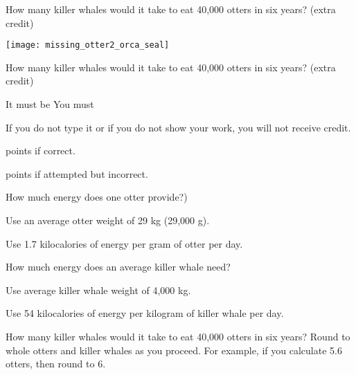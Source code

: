 \documentclass[t]{beamer}
\begin{document}
%
\begin{frame}[t]{How many killer whales would it take to eat 40,000 otters in six years? (extra credit)}

	\texttt{[image: missing\_otter2\_orca\_seal]}

\end{frame}
%
\begin{frame}[t]{How many killer whales would it take to eat 40,000 otters in six years? (extra credit)}

	\hangpara It must be  You must 

	\hangpara If you do not type it or if you do not show your work, you will not receive credit.

	 points if correct.

	 points if attempted but incorrect.

\end{frame}
%
\begin{frame}[t]{How much energy does one otter provide?)}

	\hangpara Use an average otter weight of 29 kg (29,000 g).
	
	\hangpara Use 1.7 kilocalories of energy per gram of otter per day.


\end{frame}
%
\begin{frame}[t]{How much energy does an average killer whale need?}

	\hangpara Use average killer whale weight of 4,000 kg.
	
	\hangpara Use 54 kilocalories of energy per kilogram of killer whale per day.
		
	\hangpara How many killer whales would it take to eat 40,000 otters in six years?\newline
		\hspace*{1em} Round to whole otters and killer whales as you proceed.\newline
		\hspace*{1em} For example, if you  calculate 5.6 otters, then round to 6.


\end{frame}
%
\end{document}

